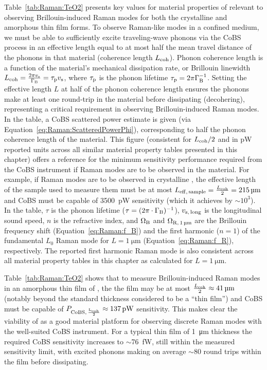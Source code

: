 Table~\ref{tab:Raman:TeO2} presents key values for material properties of  relevant to observing Brillouin-induced Raman modes for both the crystalline and amorphous thin film forms. To observe Raman-like modes in a confined medium, we must be able to sufficiently excite traveling-wave phonons via the \ac{CoBS} process in an effective length equal to at most half the mean travel distance of the phonons in that material (coherence length \(L_{\rm coh}\)). Phonon coherence length is a function of the material's mechanical dissipation rate, or Brillouin linewidth \(L_{\rm coh} = \frac{2\pi v_{\rm s}}{\Gamma_{\rm B}} = \tau_{\rm p}v_{\rm s}\), where \(\tau_{\rm p}\) is the phonon lifetime \(\tau_{\rm p} = 2\pi\Gamma_{\rm B}^{-1}\). Setting the effective length \(L\) at half of the phonon coherence length ensures the phonons make at least one round-trip in the material before dissipating (decohering), representing a critical requirement in observing Brillouin-induced Raman modes. In the table, a \ac{CoBS} scattered power estimate is given (via Equation~\ref{eq:Raman:ScatteredPowerPhi}), corresponding to half the phonon coherence length of the material. This figure (consistent for \(L_{\rm coh}/2\) and in \si{\pico\watt} reported units across all similar material property tables presented in this chapter) offers a reference for the minimum sensitivity performance required from the \ac{CoBS} instrument if Raman modes are to be observed in the material. For example, if Raman modes are to be observed in crystalline , the effective length of the sample used to measure them must be at most \(L_{\rm eff,\,sample} = \frac{L_{\rm coh}}{2} = \SI{215}{\micro\meter}\) and \ac{CoBS} must be capable of \SI{3500}{\pico\watt} sensitivity (which it achieves by \(\sim\)\(10^{3}\)). In the table, \(\tau\) is the phonon lifetime (\(\tau = (2\pi\cdot\Gamma_{\rm B})^{-1}\)), \(v_{\rm s,\,long}\) is the longitudinal sound speed, \(n\) is the refractive index, and \(\Omega_{\rm B}\) and \(\Omega_{\rm R,\,\SI{1}{\micro\meter}}\) are the Brillouin frequency shift (Equation~\ref{eq:Raman:f_B}) and the first harmonic (\(n = 1\)) of the fundamental \(L_{0}\) Raman mode for \(L = \SI{1}{\micro\meter}\) (Equation~\ref{eq:Raman:f_R}), respectively. The reported first harmonic Raman mode is also consistent across all material property tables in this chapter as calculated for \(L = \SI{1}{\micro\meter}\).

Table~\ref{tab:Raman:TeO2} shows that to measure Brillouin-induced Raman modes in an amorphous thin film of , the the film may be at most \(\frac{L_{\rm coh}}{2} \approx \SI{41}{\micro\meter}\) (notably beyond the standard thickness considered to be a ``thin film'') and \ac{CoBS} must be capable of \(P_{\rm CoBS,\,\frac{L_{\rm coh}}{2}} \approx \SI{137}{\pico\watt}\) sensitivity. This makes clear the viability of  as a good material platform for observing discrete Raman modes with the well-suited \ac{CoBS} instrument. For a typical thin film of \SI{1}{\micro\meter} thickness the required \ac{CoBS} sensitivity increases to \(\sim\)\SI{76}{\femto\watt}, still within the measured sensitivity limit, with excited phonons making on average \(\sim\)80 round trips within the film before dissipating.

